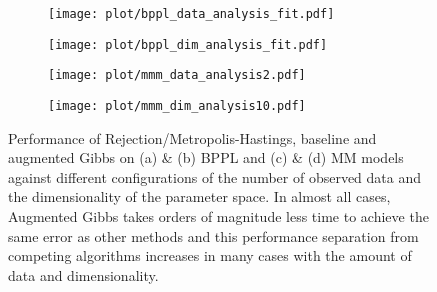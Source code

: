 \begin{figure}[thb!]
\centering
\begin{subfigure}{.49\textwidth}
  \centering
  \texttt{[image: plot/bppl\_data\_analysis\_fit.pdf]}
  \caption{}
  \label{fig:error-samples-bppl}
\end{subfigure}
\begin{subfigure}{.49\textwidth}
  \centering
  \hspace{5mm} \texttt{[image: plot/bppl\_dim\_analysis\_fit.pdf]}
  \caption{}
  \label{fig:error-samples-bppl}
\end{subfigure}
%
\centering
\begin{subfigure}{.49\textwidth}
  \centering
  \texttt{[image: plot/mmm\_data\_analysis2.pdf]}
  \caption{}
  \label{fig:mmm_data_analysis}
\end{subfigure}
\begin{subfigure}{.49\textwidth}
  \centering
  \hspace{5mm} \texttt{[image: plot/mmm\_dim\_analysis10.pdf]}
  \caption{}
  \label{fig:mmm_dim_analysis}
\end{subfigure}
\caption{Performance of Rejection/Metropolis-Hastings, baseline and augmented Gibbs on (a) \& (b) BPPL and (c) \& (d) MM models against different configurations of the number of observed data and the dimensionality of the parameter space.  In almost all cases, Augmented Gibbs takes orders of magnitude less time to achieve the same error as other methods and this performance separation from competing algorithms increases in many cases with the amount of data and dimensionality.}
\label{fig:results}
\end{figure}

